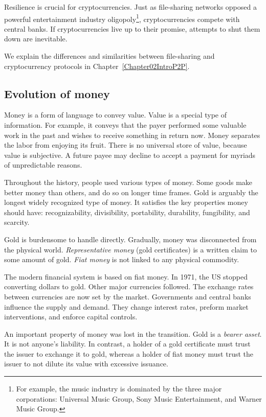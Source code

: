 Resilience is crucial for cryptocurrencies.
Just as file-sharing networks opposed a powerful entertainment industry oligopoly\footnote{For example, the music industry is dominated by the three major corporations: Universal Music Group, Sony Music Entertainment, and Warner Music Group.}, cryptocurrencies compete with central banks.
If cryptocurrencies live up to their promise, attempts to shut them down are inevitable.

We explain the differences and similarities between file-sharing and cryptocurrency protocols in Chapter~\ref{Chapter02IntroP2P}.


\subsection{Evolution of money}

Money is a form of language to convey value.
Value is a special type of information.
For example, it conveys that the payer performed some valuable work in the past and wishes to receive something in return now.
Money separates the labor from enjoying its fruit.
There is no universal store of value, because value is subjective.
A future payee may decline to accept a payment for myriads of unpredictable reasons.

Throughout the history, people used various types of money.
Some goods make better money than others, and do so on longer time frames.
Gold is arguably the longest widely recognized type of money.
It satisfies the key properties money should have: recognizability, divisibility, portability, durability, fungibility, and scarcity.

Gold is burdensome to handle directly.
Gradually, money was disconnected from the physical world.
\textit{Representative money} (gold certificates) is a written claim to some amount of gold.
\textit{Fiat money} is not linked to any physical commodity.

The modern financial system is based on fiat money.
In 1971, the US stopped converting dollars to gold.
Other major currencies followed.
The exchange rates between currencies are now set by the market.
Governments and central banks influence the supply and demand.
They change interest rates, preform market interventions, and enforce capital controls.

An important property of money was lost in the transition.
Gold is a \textit{bearer asset}.
It is not anyone's liability.
In contrast, a holder of a gold certificate must trust the issuer to exchange it to gold, whereas a holder of fiat money must trust the issuer to not dilute its value with excessive issuance.


